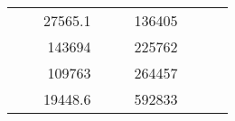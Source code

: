 \begin{table}[]
\begin{tabular}{|ccrccrccc}
\multicolumn{1}{|c|}{\cellcolor[HTML]{FFFFC7}}                                & \multicolumn{1}{c|}{\cellcolor[HTML]{DDFDFF}}                      & \multicolumn{1}{r|}{\cellcolor[HTML]{DAE8FC}27565.1}   & \multicolumn{1}{c|}{\cellcolor[HTML]{FFFFC7}}                                & \multicolumn{1}{c|}{\cellcolor[HTML]{DDFDFF}}                       & \multicolumn{1}{r|}{\cellcolor[HTML]{DDFDFF}136405}    &                                                                              &                                                                    &                                                        \\ \cline{3-3} \cline{6-6}
\multicolumn{1}{|c|}{\cellcolor[HTML]{FFFFC7}}                                & \multicolumn{1}{c|}{\cellcolor[HTML]{DDFDFF}}                      & \multicolumn{1}{r|}{\cellcolor[HTML]{DDFDFF}143694}    & \multicolumn{1}{c|}{\cellcolor[HTML]{FFFFC7}}                                & \multicolumn{1}{c|}{\cellcolor[HTML]{DDFDFF}}                       & \multicolumn{1}{r|}{\cellcolor[HTML]{DAE8FC}225762}    &                                                                              &                                                                    &                                                        \\ \cline{3-3} \cline{6-6}
\multicolumn{1}{|c|}{\cellcolor[HTML]{FFFFC7}}                                & \multicolumn{1}{c|}{\cellcolor[HTML]{DDFDFF}}                      & \multicolumn{1}{r|}{\cellcolor[HTML]{DAE8FC}109763}    & \multicolumn{1}{c|}{\cellcolor[HTML]{FFFFC7}}                                & \multicolumn{1}{c|}{\cellcolor[HTML]{DDFDFF}}                       & \multicolumn{1}{r|}{\cellcolor[HTML]{DDFDFF}264457}    &                                                                              &                                                                    &                                                        \\ \cline{3-3} \cline{6-6}
\multicolumn{1}{|c|}{\cellcolor[HTML]{FFFFC7}}                                & \multicolumn{1}{c|}{\cellcolor[HTML]{DDFDFF}}                      & \multicolumn{1}{r|}{\cellcolor[HTML]{DDFDFF}19448.6}   & \multicolumn{1}{c|}{\cellcolor[HTML]{FFFFC7}}                                & \multicolumn{1}{c|}{\cellcolor[HTML]{DDFDFF}}                       & \multicolumn{1}{r|}{\cellcolor[HTML]{DAE8FC}592833}    &                                                                              &                                                                    &                                                        \\ \cline{3-3} \cline{6-6}

\end{tabular}
\end{table}
